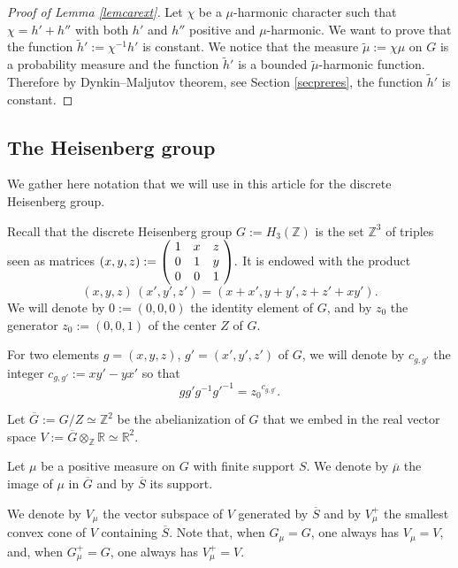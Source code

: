 \documentclass[11pt]{article}
\numberwithin{equation}{section}
\theoremstyle{definition}
\newcommand{\m}[1]{\mathbb{ #1}}
\let\ol\overline
\let\bq\relax
\let\eq\relax
\begin{document}
\begin{proof}[Proof of Lemma \ref{lemcarext}]
Let $\chi$ be a $\mu$-harmonic character
such that $\chi=h'+h''$
with both $h'$ and $h''$
positive and $\mu$-harmonic.
We want to prove that the function $\widetilde{h}':=\chi^{-1}h'$
is constant.
We notice that the measure $\widetilde\mu:=\chi\mu$ on $G$
is a probability measure and the function $\widetilde h'$
is a bounded $\widetilde\mu$-harmonic function.
Therefore by Dynkin--Maljutov theorem,
see Section \ref{secpreres}, the function $\widetilde h'$ is constant.
\end{proof}

\subsection{The Heisenberg group}
\label{secheigro}

\bq
We gather here notation that we will use in this article
for the discrete Heisenberg group.
\eq

Recall that the discrete Heisenberg group $G:=H_3(\m Z)$ is the set $\m Z^3$
of triples seen as matrices
$(x,y,z):=\mbox{\scriptsize
$\left(\!
\begin{array}{ccc} 1 &x&z \\
0 &1&y\\
0&0&1
\end{array}\!
\right)$}.
$
It is endowed with the product
\begin{equation}
\label{eqnprohei}
(x,y,z)\, (x',y',z')= (x+x',y+y',z+z'+xy').
\end{equation}
We will denote by $0:=(0,0,0)$ the identity element of $G$,
and by $z_0$ the generator $z_0:=(0,0,1)$ of the center $Z$ of $G$.

For two elements $g=(x,y,z)$, $g'=(x',y',z')$ of $G$, we will denote
by $c_{g,g'}$ the integer $c_{g,g'}:=xy'\!-\!yx'$ so that
\begin{equation}
\label{eqncggzoc}
gg'g^{-1}{g'}^{-1}={z_0}^{c_{g,g'}}.
\end{equation}

Let $\ol{G}:=G/Z\simeq \m Z^2$ be the abelianization of $G$
that we embed in the real vector space
$V:=\ol{G}\otimes_{\m Z}\m R\simeq \m R^2$.

Let $\mu$ be a positive measure on $G$ with finite support $S$.
We denote by $\ol{\mu}$ the image of $\mu$ in $\ol{G}$ and
by $\ol{S}$ its support.

We denote by $V_\mu$ the vector subspace of $V$ generated by $\ol{S}$
and by $V^+_\mu$ the smallest convex cone of $V$ containing $\ol{S}$.
Note that, when $G_\mu=G$, one always has $V_\mu=V$,
and, when $G^+_\mu=G$, one always has $V^+_\mu=V$.
\end{document}
